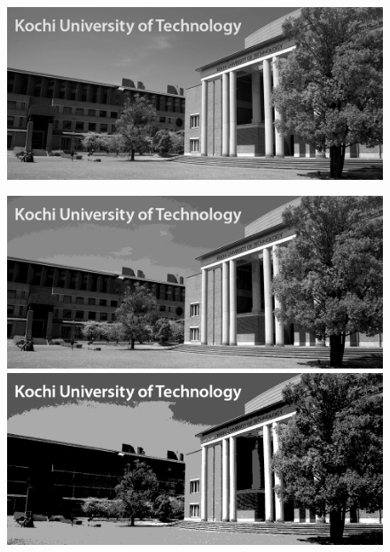 \begin{figure}[H]
    \centering
    \begin{minipage}[b]{.23\textwidth}
        \centering
        \includegraphics[keepaspectratio,width=\textwidth]{../../Figures/05_21_gimg.png}
        \label{fig:グレイスケール画像}
    \end{minipage}
    \begin{minipage}[b]{.23\textwidth}
        \centering
        \includegraphics[keepaspectratio,width=\textwidth]{../../Figures/05_22_4bit.png}
    \end{minipage}
    \begin{minipage}[b]{.23\textwidth}
        \centering
        \includegraphics[keepaspectratio,width=\textwidth]{../../Figures/05_23_2bit.png}

\end{minipage}
\end{figure}

